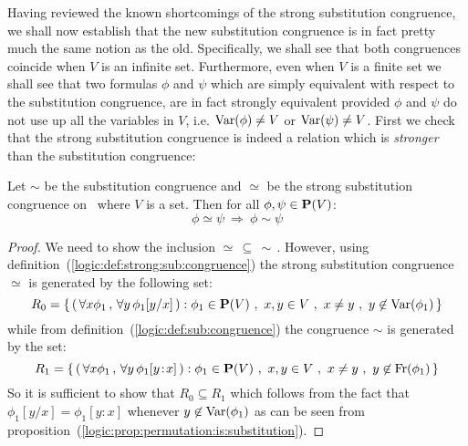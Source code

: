 Having reviewed the known shortcomings of the strong substitution
congruence, we shall now establish that the new substitution
congruence is in fact pretty much the same notion as the old.
Specifically, we shall see that both congruences coincide when $V$
is an infinite set. Furthermore, even when $V$ is a finite set we
shall see that two formulas $\phi$ and $\psi$ which are simply
equivalent with respect to the substitution congruence, are in fact
strongly equivalent provided $\phi$ and $\psi$ do not use up all the
variables in $V$, i.e. $\mbox{\rm Var}(\phi)\neq V$ or $\mbox{\rm Var}(\psi)\neq V$.
First we check that the strong substitution congruence is indeed a
relation which is {\em stronger} than the substitution congruence:

\begin{prop}\label{logic:prop:strong:implies:quant}
Let $\sim$ be the substitution congruence and $\simeq$ be the strong
substitution congruence on \pv\ where $V$ is a set. Then for all
$\phi,\psi\in\mbox{${\bf P}(V)$}$:
    \[
    \phi\simeq\psi\ \Rightarrow\ \phi\sim\psi
    \]
\end{prop}
\begin{proof}
We need to show the inclusion $\simeq\,\subseteq\,\sim$\,. However,
using definition~(\ref{logic:def:strong:sub:congruence}) the strong
substitution congruence $\simeq$ is generated by the following set:
    \[
    R_{0}=\left\{\,(\,\forall x\phi_{1}\,,\,\forall
    y\,\phi_{1}[y/x]\,):\phi_{1}\in\mbox{${\bf P}(V)$}\ ,\ x,y\in V\ ,\ x\neq y\ ,\
    y\not\in\mbox{\rm Var}(\phi_{1})\,\right\}
    \]
while from definition~(\ref{logic:def:sub:congruence}) the
congruence $\sim$ is generated by the set:
     \[
    R_{1}=\left\{\,(\,\forall x\phi_{1}\,,\,\forall y\,\phi_{1}[y\!:\!x]\,):
    \phi_{1}\in\pv\ ,\ x,y\in V\ ,\ x\neq y\ ,\ y\not\in\free(\phi_{1})\,\right\}
    \]
So it is sufficient to show that $R_{0}\subseteq R_{1}$ which
follows from the fact that $\phi_{1}[y/x]=\phi_{1}[y\!:\!x]$
whenever $y\not\in\mbox{\rm Var}(\phi_{1})$ as can be seen from
proposition~(\ref{logic:prop:permutation:is:substitution}).
\end{proof}


